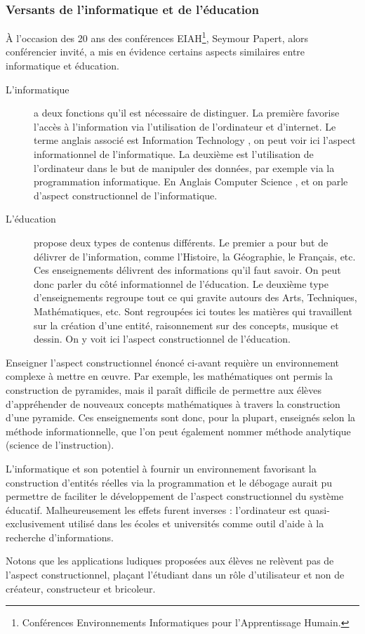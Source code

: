 \subsubsection{Versants de l'informatique et de l'éducation}
À l'occasion des 20 ans des conférences EIAH\footnote{Conférences Environnements Informatiques pour l'Apprentissage Humain.}, Seymour Papert, alors conférencier invité, a mis en évidence certains aspects similaires entre informatique et éducation.

\begin{description}
  \item[L'informatique] a deux fonctions qu'il est nécessaire de distinguer. La première favorise l'accès à l'information via l'utilisation de l'ordinateur et d'internet. Le terme anglais associé est \og Information Technology \fg{}, on peut voir ici l'aspect informationnel de l'informatique. La deuxième est l'utilisation de l'ordinateur dans le but de manipuler des données, par exemple via la programmation informatique. En Anglais \og Computer Science \fg{}, et on parle d'aspect constructionnel de l'informatique.
  \item[L'éducation] propose deux types de contenus différents. Le premier a pour but de délivrer de l'information, comme l'Histoire, la Géographie, le Français, etc. Ces enseignements délivrent des informations qu'il faut savoir. On peut donc parler du côté informationnel de l'éducation. Le deuxième type d'enseignements regroupe tout ce qui gravite autours des Arts, Techniques, Mathématiques, etc. Sont regroupées ici toutes les matières qui travaillent sur la création d'une entité, raisonnement sur des concepts, musique et dessin. On y voit ici l'aspect constructionnel de l'éducation.
\end{description}

Enseigner l'aspect constructionnel énoncé ci-avant requière un environnement complexe à mettre en œuvre. Par exemple, les mathématiques ont permis la construction de pyramides, mais il paraît difficile de permettre aux élèves d’appréhender de nouveaux concepts mathématiques à travers la construction d'une pyramide. Ces enseignements sont donc, pour la plupart, enseignés selon la méthode informationnelle, que l'on peut également nommer méthode analytique (science de l'instruction).

L'informatique et son potentiel à fournir un environnement favorisant la construction d'entités réelles via la programmation et le débogage aurait pu permettre de faciliter le développement de l'aspect constructionnel du système éducatif. Malheureusement les effets furent inverses : l'ordinateur est quasi-exclusivement utilisé dans les écoles et universités comme outil d'aide à la recherche d'informations.

Notons que les applications \og ludiques \fg{} proposées aux élèves ne relèvent pas de l'aspect constructionnel, plaçant l'étudiant dans un rôle d'utilisateur et non de créateur, constructeur et bricoleur.